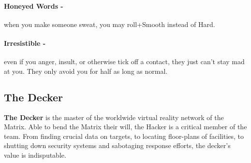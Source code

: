 \paragraph{Honeyed Words -} when you make someone sweat, you may roll+Smooth instead of Hard.

\paragraph{Irresistible -} even if you anger, insult, or otherwise tick off a contact, they just can’t stay mad at you. They only avoid you for half as long as normal.



\clearpage
\subsection{The Decker}
\textbf{The Decker} is the master of the worldwide virtual reality network of the Matrix. Able to bend the Matrix their will, the Hacker is a critical member of the team. From finding crucial data on targets, to locating floor-plans of facilities, to shutting down security systems and sabotaging response efforts, the decker’s value is indisputable.

